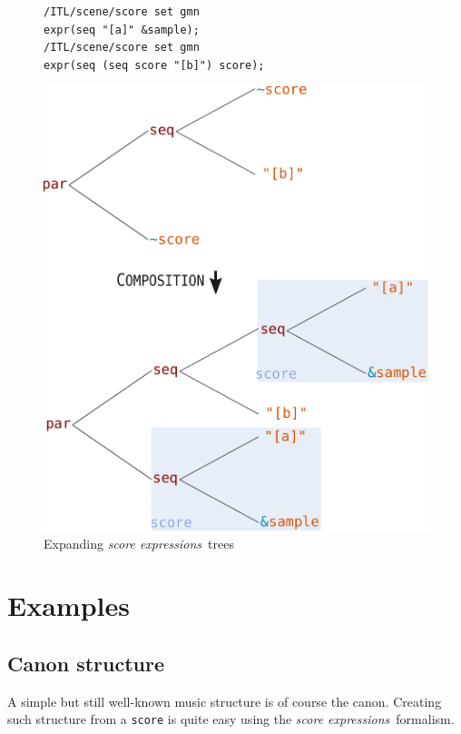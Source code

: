 \documentclass{article}
\newcommand{\OSC}[1]{\texttt{#1}}
\newcommand{\oper}[1]{\textcolor{figRed}{#1}}
\newcommand{\param}[1]{\textcolor{figOrange}{#1}}
\newcommand{\prefix}[1]{\textcolor{figBlue}{#1}}
\newcommand{\sExpr}{\emph{score expressions}}
\newcommand{\lowTilde}{\texttildelow}
\newcommand{\tab}{\hspace*{4mm}}
\newcommand{\sample}	[1]			{\vspace{-0.2em}\begin{center}\colorbox{mygrey}{\begin{minipage}[t]{0.95\columnwidth} {\small \texttt{#1}}\end{minipage}}\end{center}}
\begin{document}
\begin{figure}[th]

\sample{/ITL/scene/score set gmn\\
\tab expr(\oper{seq} \param{"[a]"} \prefix{\&}\param{sample});\\
/ITL/scene/score set gmn  \\
\tab expr(\oper{seq} (\oper{seq} \prefix{\lowTilde}\param{score} \param{"[b]"}) \prefix{\lowTilde}\param{score});
}

\centering
\includegraphics[width=0.9\columnwidth]{imgs/expandingTree}
\caption{Expanding \sExpr\ trees
\label{fig:expandingTree}}
\end{figure}


\section{Examples}
\label{examples}

\subsection{Canon structure}

A simple but still well-known music structure is of course the canon. Creating such structure from a \OSC{score} is quite easy using the \sExpr\ formalism.
\end{document}
